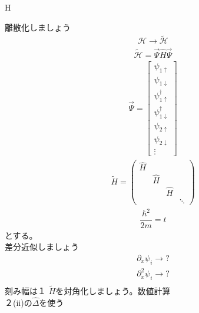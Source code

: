 H\documentclass{jarticle}
\begin{document}
離散化しましょう\\
\begin{align}
 \mathcal{H}\rightarrow \tilde{\mathcal{H}}
\end{align}
\begin{align}
  \tilde{\mathcal{H}}=\vec{\Psi}\hat{H}\vec{\Psi}
 \end{align}
 \begin{align}
  \vec{\Psi}=\begin{bmatrix}
  \psi_{1\uparrow} \\
  \psi_{1\downarrow} \\
  \psi_{1\uparrow}^\dagger \\
  \psi_{1\downarrow}^\dagger\\
  \psi_{2\uparrow} \\
  \psi_{2\downarrow} \\
  \vdots
 \end{bmatrix}
\end{align}
\begin{align}
\tilde{H}=
\begin{pmatrix}
\hat{H} &  &  &  \\
& \hat{H} &  &  \\
&  & \hat{H} &  \\
&  &  & \ddots
\end{pmatrix}
\end{align}
\begin{align}
\dfrac{\hbar^2}{2m}=t
\end{align}
とする。\\
差分近似しましょう\\
\begin{align}
\partial_x \psi_i\rightarrow?\\
\partial^2_x \psi_i\rightarrow?\\
\end{align}
刻み幅は$１$
$\tilde{H}$を対角化しましょう。数値計算\\
２(ii)の$\hat{\Delta}$を使う\\
\end{document}
